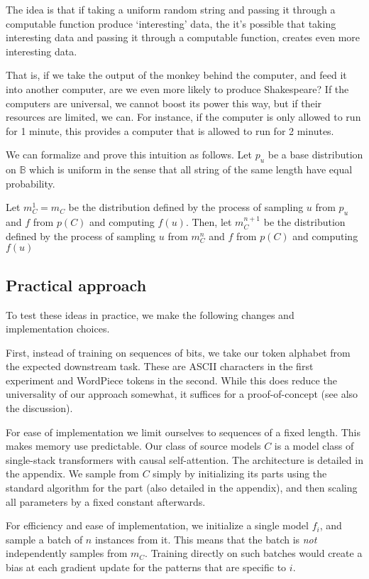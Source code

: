 \documentclass{article} %
\newcommand{\B}{\mathbb B}
\begin{document}
The idea is that if taking a uniform random string and passing it through a computable function produce `interesting' data, the it's possible that taking interesting data and passing it through a computable function, creates even more interesting data. 

That is, if we take the output of the monkey behind the computer, and feed it into another computer, are we even more likely to produce Shakespeare? If the computers are universal, we cannot boost its power this way, but if their resources are limited, we can. For instance, if the computer is only allowed to run for 1 minute, this provides a computer that is allowed to run for 2 minutes.

We can formalize and prove this intuition as follows. Let $p_u$ be a base distribution on $\B$ which is uniform in the sense that all string of the same length have equal probability.

Let $m^1_C = m_C$ be the distribution defined by the process of sampling $u$ from $p_u$ and $f$ from $p(C)$ and computing $f(u)$. Then, let $m^{n+1}_C$ be the distribution defined by the process of sampling $u$ from $m^n_C$ and $f$ from $p(C)$ and computing $f(u)$


\subsection{Practical approach}

To test these ideas in practice, we make the following changes and implementation choices. 

First, instead of training on sequences of bits, we take our token alphabet from the expected downstream task. These are ASCII characters in the first experiment and WordPiece tokens in the second. While this does reduce the universality of our approach somewhat, it suffices for a proof-of-concept (see also the discussion).

For ease of implementation we limit ourselves to sequences of a fixed length. This makes memory use predictable. Our class of source models $C$ is a model class of single-stack transformers with causal self-attention. The architecture is detailed in the appendix. We sample from $C$ simply by initializing its parts using the standard algorithm for the part (also detailed in the appendix), and then scaling all parameters by a fixed constant afterwards. 

For efficiency and ease of implementation, we initialize a single model $f_i$, and sample a batch of $n$ instances from it. This means that the batch is \emph{not} independently samples from $m_C$. Training directly on such batches would create a bias at each gradient update for the patterns that are specific to $i$. 
\end{document}
